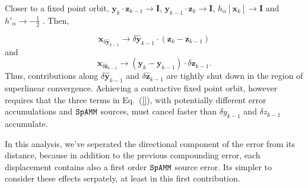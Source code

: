 \documentclass[letterpaper,twocolumn,amsmath,amsfont,amssymb,english,aps,jcp,preprintnumbers,groupaddress,nofootinbib,tightenlines]{revtex4}
\newcommand{\mat}[1]{\boldsymbol{#1}}
\begin{document}
Closer to a fixed point orbit,  $\mat{y}_k \cdot \mat{z}_{k-1} \rightarrow \mat{I}$, $\mat{y}_{k-1} \cdot \mat{z}_{k} \rightarrow \mat{I}$,
$h_\alpha \left[ \mat{x}_{k} \right] \rightarrow \mat{I}$ and $h'_\alpha \rightarrow - \frac{1}{2}$ \cite{higham2005}.  Then,

\begin{equation} \label{yorbit}
 \mat{x}_{\delta \widehat{ \mat{y}}_{k-1}} \rightarrow \delta \widehat{\mat{y}}_{k-1} \cdot \left( \mat{z}_k-\mat{z}_{k-1} \right)
\end{equation}
and
\begin{equation} \label{zorbit}
 \mat{x}_{\delta \widehat{ \mat{z}}_{k-1}} \rightarrow \left( \mat{y}_k-\mat{y}_{k-1} \right) \cdot \delta \widehat{\mat{z}}_{k-1} .
\end{equation}
Thus, contributions along $\delta \widehat{\mat{y}}_{k-1}$ and $\delta \widehat{\mat{z}}_{k-1}$ are tightly shut down in the 
region of superlinear convergence.  Achieving a contractive fixed point orbit, however requires that the three terms in Eq.~(\ref{}),  
with potentially different error accumulations and $\tt SpAMM$ sources, must cancel faster than $\delta y_{k-1}$ 
and $\delta z_{k-1}$ accumulate.

In this analysis, we've seperated the directional component of the error from its distance, because in addition to the
previous compounding error, each displacement contains also a first order $\tt SpAMM$ source error.  Its simpler to 
consider these effects serpately, at least in this first contribution. 
\end{document}
